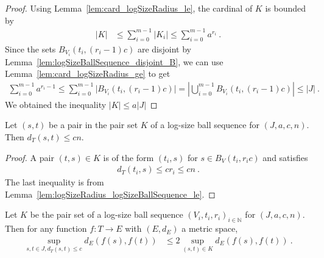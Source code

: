 \begin{proof}
  \leanok
Using Lemma~\ref{lem:card_logSizeRadius_le}, the cardinal of $K$ is bounded by
\begin{align*}
  \vert K \vert
  &\le \sum_{i=0}^{m-1} \vert K_i \vert
  \le \sum_{i=0}^{m-1} a^{r_i}
  \: .
\end{align*}
Since the sets $B_{V_i}(t_i, (r_i-1)c)$ are disjoint by Lemma~\ref{lem:logSizeBallSequence_disjoint_B}, we can use Lemma~\ref{lem:card_logSizeRadius_ge} to get
\begin{align*}
  \sum_{i=0}^{m-1} a^{r_i - 1}
  \le \sum_{i=0}^{m-1} \vert B_{V_i}(t_i, (r_i-1)c) \vert
  = \left\vert \bigcup_{i=0}^{m-1} B_{V_i}(t_i, (r_i-1)c) \right\vert
  \le \vert J \vert
  \: .
\end{align*}
We obtained the inequality $\vert K \vert \le a \vert J \vert$
\end{proof}


\begin{lemma}\label{lem:dist_le_of_mem_pairSet}
  \mathlibok
Let $(s, t)$ be a pair in the pair set $K$ of a log-size ball sequence for $(J, a, c, n)$.
Then $d_T(s, t) \le c n$.
\end{lemma}

\begin{proof}
  \leanok
A pair $(t, s) \in K$ is of the form $(t_i, s)$ for $s \in B_V(t_i, r_i c)$ and satisfies
\begin{align*}
  d_T(t_i, s) \le c r_i \le c n \: .
\end{align*}
The last inequality is from Lemma~\ref{lem:logSizeRadius_logSizeBallSequence_le}.
\end{proof}


\begin{lemma}\label{lem:sup_dist_le_two_mul_sup_dist_pairSet}
  \mathlibok
Let $K$ be the pair set of a log-size ball sequence $(V_i, t_i, r_i)_{i \in \mathbb{N}}$ for $(J, a, c, n)$.
Then for any function $f : T \to E$ with $(E,d_E)$ a metric space,
\begin{align*}
  \sup_{s,t\in J, d_T(s,t) \le c} d_E(f(s), f(t))
  & \le 2 \sup_{(s,t) \in K} d_E(f(s), f(t))
  \: .
\end{align*}
\end{lemma}


